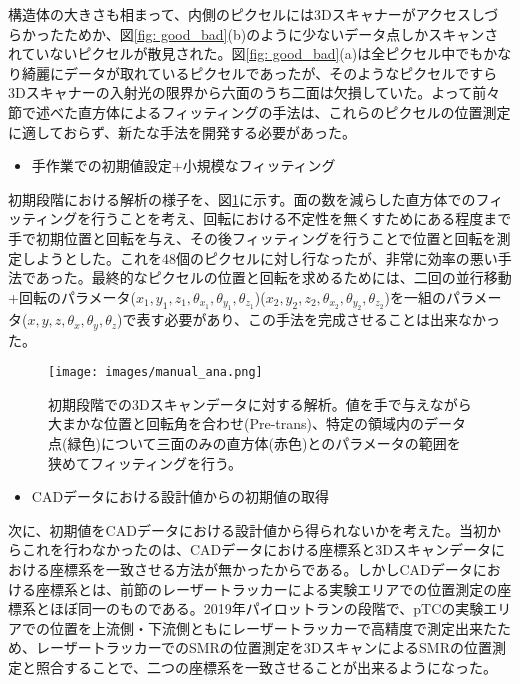\documentclass[Yonemoto_master.tex]{subfiles}
\begin{document}
構造体の大きさも相まって、内側のピクセルには3Dスキャナーがアクセスしづらかったためか、図\ref{fig: good_bad}(b)のように少ないデータ点しかスキャンされていないピクセルが散見された。図\ref{fig: good_bad}(a)は全ピクセル中でもかなり綺麗にデータが取れているピクセルであったが、そのようなピクセルですら3Dスキャナーの入射光の限界から六面のうち二面は欠損していた。よって前々節で述べた直方体によるフィッティングの手法は、これらのピクセルの位置測定に適しておらず、新たな手法を開発する必要があった。

\begin{itemize}
\item 手作業での初期値設定+小規模なフィッティング
\end{itemize}
初期段階における解析の様子を、図\ref{fig: manual}に示す。面の数を減らした直方体でのフィッティングを行うことを考え、回転における不定性を無くすためにある程度まで手で初期位置と回転を与え、その後フィッティングを行うことで位置と回転を測定しようとした。これを48個のピクセルに対し行なったが、非常に効率の悪い手法であった。最終的なピクセルの位置と回転を求めるためには、二回の並行移動+回転のパラメータ($x_1,y_1,z_1,\theta_{x_1},\theta_{y_1},\theta_{z_1}$)($x_2,y_2,z_2,\theta_{x_2},\theta_{y_2},\theta_{z_2}$)を一組のパラメータ($x,y,z,\theta_{x},\theta_{y},\theta_{z}$)で表す必要があり、この手法を完成させることは出来なかった。

\begin{figure}[h]
\begin{center}
\texttt{[image: images/manual\_ana.png]}
\caption{初期段階での3Dスキャンデータに対する解析。値を手で与えながら大まかな位置と回転角を合わせ(Pre-trans)、特定の領域内のデータ点(緑色)について三面のみの直方体(赤色)とのパラメータの範囲を狭めてフィッティングを行う。}
\label{fig: manual}
\end{center}
\end{figure}

\begin{itemize}
\item CADデータにおける設計値からの初期値の取得
\end{itemize}
次に、初期値をCADデータにおける設計値から得られないかを考えた。当初からこれを行わなかったのは、CADデータにおける座標系と3Dスキャンデータにおける座標系を一致させる方法が無かったからである。しかしCADデータにおける座標系とは、前節のレーザートラッカーによる実験エリアでの位置測定の座標系とほぼ同一のものである。2019年パイロットランの段階で、pTCの実験エリアでの位置を上流側・下流側ともにレーザートラッカーで高精度で測定出来たため、レーザートラッカーでのSMRの位置測定を3DスキャンによるSMRの位置測定と照合することで、二つの座標系を一致させることが出来るようになった。
\end{document}
